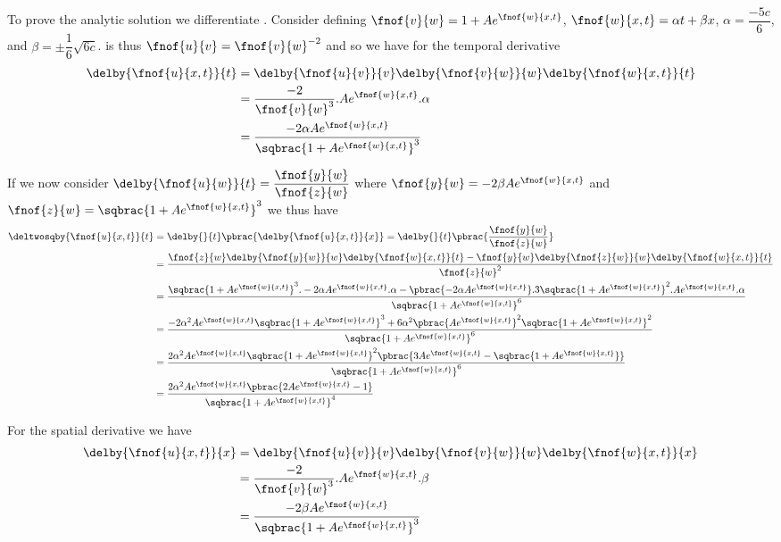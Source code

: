 To prove the analytic solution we differentiate
. Consider
defining $\fnof{v}{w}=1+Ae^{\fnof{w}{x,t}}$, $\fnof{w}{x,t}=\alpha t +
\beta x$, $\alpha=\dfrac{-5c}{6}$, and
$\beta=\pm\dfrac{1}{6}\sqrt{6c}$. 
is thus $\fnof{u}{v}=\fnof{v}{w}^{-2}$ and so we have for the temporal derivative
\begin{align}
  \delby{\fnof{u}{x,t}}{t}&=\delby{\fnof{u}{v}}{v}\delby{\fnof{v}{w}}{w}\delby{\fnof{w}{x,t}}{t} \\
  &=\dfrac{-2}{\fnof{v}{w}^{3}}.Ae^{\fnof{w}{x,t}}.\alpha \\
  &=\dfrac{-2\alpha A e^{\fnof{w}{x,t}}}{\sqbrac{1+A e^{\fnof{w}{x,t}}}^{3}}
\end{align}

If we now consider
$\delby{\fnof{u}{w}}{t}=\dfrac{\fnof{y}{w}}{\fnof{z}{w}}$ where
$\fnof{y}{w}=-2\beta A e^{\fnof{w}{x,t}}$ and
$\fnof{z}{w}=\sqbrac{1+A e^{\fnof{w}{x,t}}}^{3}$ we thus have
\begin{align}
  \deltwosqby{\fnof{u}{x,t}}{t}&=\delby{}{t}\pbrac{\delby{\fnof{u}{x,t}}{x}}=\delby{}{t}\pbrac{\dfrac{\fnof{y}{w}}{\fnof{z}{w}}}\\
  &=\dfrac{\fnof{z}{w}\delby{\fnof{y}{w}}{w}\delby{\fnof{w}{x,t}}{t}-
    \fnof{y}{w}\delby{\fnof{z}{w}}{w}\delby{\fnof{w}{x,t}}{t}}{\fnof{z}{w}^{2}} \\
  &=\dfrac{\sqbrac{1+A e^{\fnof{w}{x,t}}}^{3}.-2\alpha A e^{\fnof{w}{x,t}}.\alpha-
    \pbrac{-2\alpha A e^{\fnof{w}{x,t}}}.3\sqbrac{1+A e^{\fnof{w}{x,t}}}^{2}.A e^{\fnof{w}{x,t}}.\alpha}{\sqbrac{1+A e^{\fnof{w}{x,t}}}^{6}} \\
  &=\dfrac{-2\alpha^{2}A e^{\fnof{w}{x,t}}\sqbrac{1+A e^{\fnof{w}{x,t}}}^{3}+
    6\alpha^{2}\pbrac{A e^{\fnof{w}{x,t}}}^{2}\sqbrac{1+A e^{\fnof{w}{x,t}}}^{2}}{\sqbrac{1+A e^{\fnof{w}{x,t}}}^{6}}\\
  &=\dfrac{2\alpha^{2}A e^{\fnof{w}{x,t}}\sqbrac{1+A e^{\fnof{w}{x,t}}}^{2}\pbrac{3A e^{\fnof{w}{x,t}}-
      \sqbrac{1+A e^{\fnof{w}{x,t}}}}}{\sqbrac{1+A e^{\fnof{w}{x,t}}}^{6}} \\
  &=\dfrac{2\alpha^{2}A e^{\fnof{w}{x,t}}\pbrac{2A e^{\fnof{w}{x,t}}-1}}{\sqbrac{1+A e^{\fnof{w}{x,t}}}^{4}}
\end{align}

For the spatial derivative we have
\begin{align}
  \delby{\fnof{u}{x,t}}{x}&=\delby{\fnof{u}{v}}{v}\delby{\fnof{v}{w}}{w}\delby{\fnof{w}{x,t}}{x} \\
  &=\dfrac{-2}{\fnof{v}{w}^{3}}.Ae^{\fnof{w}{x,t}}.\beta \\
  &=\dfrac{-2\beta A e^{\fnof{w}{x,t}}}{\sqbrac{1+A e^{\fnof{w}{x,t}}}^{3}}
\end{align}

